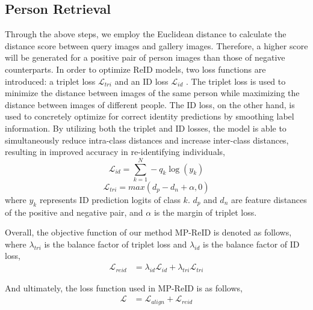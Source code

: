 \documentclass[letterpaper]{article} %
\begin{document}
\subsection{Person Retrieval}\label{pr}
Through the above steps, we employ the Euclidean distance to calculate the distance score between query images and gallery images. Therefore, a higher score will be generated for a positive pair of person images than those of negative counterparts. In order to optimize ReID models, two loss functions are introduced: a triplet loss $\mathcal{L}_{tri}$ \cite{hermans2017defense} and an ID loss $\mathcal{L}_{id}$ \cite{zheng2017person}. The triplet loss is used to minimize the distance between images of the same person while maximizing the distance between images of different people. The ID loss, on the other hand, is used to concretely optimize for correct identity predictions by smoothing label information. By utilizing both the triplet and ID losses, the model is able to simultaneously reduce intra-class distances and increase inter-class distances, resulting in improved accuracy in re-identifying individuals,
\begin{equation}\label{eqn8}
\mathcal{L}_{id}={\sum_{k=1}^N -q_{k}\log (y_{k})}
\end{equation}
\begin{equation}\label{eqn9}
\mathcal{L}_{tri} = max(d_{p} - d_{n}+\alpha,0)
\end{equation}
where ${y}_{k}$ represents ID prediction logits of class $k$. $d_p$ and $d_n$ are feature distances of the positive and negative pair, and $\alpha$ is the margin of triplet loss.

Overall, the objective function of our method MP-ReID is denoted as follows, where $\lambda_{tri}$ is the balance factor of triplet loss and $\lambda_{id}$ is the balance factor of ID loss,
\begin{equation}\label{eqn7}
\begin{aligned}
\mathcal{L}_{reid} &=\lambda_{id} \mathcal{L}_{id}+ \lambda_{tri}\mathcal{L}_{tri}
\end{aligned}
\end{equation}

And ultimately, the loss function used in MP-ReID is as follows,
\begin{equation}\label{eqn7}
\begin{aligned}
\mathcal{L} &=\mathcal{L}_{align}+\mathcal{L}_{reid}
\end{aligned}
\end{equation}
\end{document}
